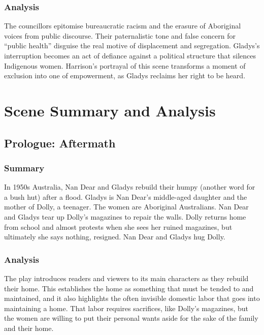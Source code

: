 \documentclass[a4paper]{article}
\begin{document}
\subsubsection{Analysis}
The councillors epitomise bureaucratic racism and the erasure of Aboriginal voices from public discourse. Their paternalistic tone and false concern for “public health” disguise the real motive of displacement and segregation. Gladys’s interruption becomes an act of defiance against a political structure that silences Indigenous women. Harrison’s portrayal of this scene transforms a moment of exclusion into one of empowerment, as Gladys reclaims her right to be heard.\\




\newpage
\section{Scene Summary and Analysis}

\subsection{Prologue: Aftermath}
\subsubsection{Summary}
In 1950s Australia, Nan Dear and Gladys rebuild their humpy
(another word for a bush hut) after a flood. Gladys is Nan
Dear’s middle-aged daughter and the mother of Dolly, a
teenager. The women are Aboriginal Australians. Nan Dear and
Gladys tear up Dolly’s magazines to repair the walls. Dolly
returns home from school and almost protests when she sees
her ruined magazines, but ultimately she says nothing,
resigned. Nan Dear and Gladys hug Dolly.\\

\subsubsection{Analysis}
The play introduces readers and viewers to its main characters as
they rebuild their home. This establishes the home as something
that must be tended to and maintained, and it also highlights the
often invisible domestic labor that goes into maintaining a home.
That labor requires sacrifices, like Dolly’s magazines, but the women
are willing to put their personal wants aside for the sake of the
family and their home.\\
\end{document}
